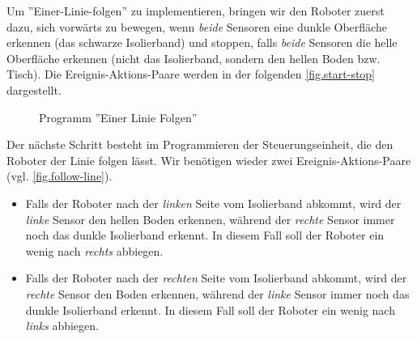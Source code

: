Um ''Einer-Linie-folgen'' zu implementieren, bringen wir den Roboter zuerst dazu,  sich vorwärts zu bewegen, wenn \emph{beide} Sensoren eine dunkle Oberfläche erkennen (das schwarze Isolierband) und stoppen, falls \emph{beide} Sensoren die helle Oberfläche erkennen (nicht das Isolierband, sondern den hellen Boden bzw. Tisch). Die Ereignis-Aktions-Paare werden in der folgenden \cref{fig.start-stop} dargestellt.
                  
\begin{figure}
\hfill
{}
\caption{Programm ''Einer Linie Folgen''}\label{fig.follow-line-all}
\end{figure}




Der nächste Schritt besteht im Programmieren der Steuerungseinheit,
die den Roboter der Linie folgen lässt. Wir benötigen wieder zwei Ereignis-Aktions-Paare (vgl. \cref{fig.follow-line}).

\begin{itemize}

\item Falls der Roboter nach der \emph{linken} Seite vom Isolierband abkommt, wird der \emph{linke} Sensor den hellen Boden erkennen, während der \emph{rechte} Sensor immer noch das dunkle Isolierband erkennt. In diesem Fall soll der Roboter ein wenig nach \emph{rechts} abbiegen.

\item Falls der Roboter nach der \emph{rechten} Seite vom Isolierband abkommt, wird der \emph{rechte} Sensor den Boden erkennen, während der \emph{linke} Sensor immer noch das dunkle Isolierband  erkennt. In diesem Fall soll der Roboter ein wenig nach \emph{links} abbiegen.

\end{itemize}

